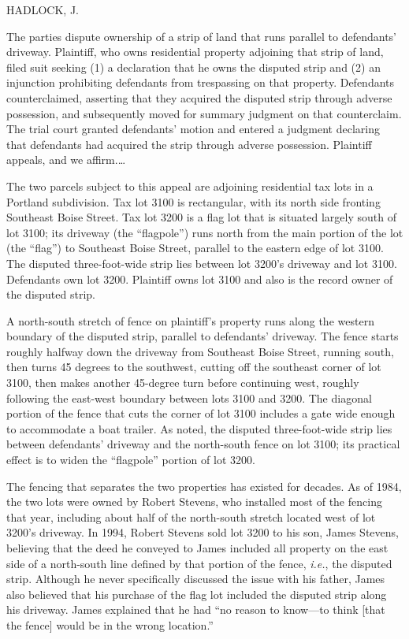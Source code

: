 
HADLOCK, J.

The parties dispute ownership of a strip of land that runs parallel to
defendants' driveway. Plaintiff, who owns residential property adjoining that
strip of land, filed suit seeking (1) a declaration that he owns the disputed
strip and (2) an injunction prohibiting defendants from trespassing on that
property. Defendants counterclaimed, asserting that they acquired the disputed
strip through adverse possession, and subsequently moved for summary judgment
on that counterclaim. The trial court granted defendants' motion and entered a
judgment declaring that defendants had acquired the strip through adverse
possession. Plaintiff appeals, and we affirm.\ldots


The two parcels subject to this appeal are adjoining residential tax lots in a
Portland subdivision. Tax lot 3100 is rectangular, with its north side fronting
Southeast Boise Street. Tax lot 3200 is a flag lot that is situated largely
south of lot 3100; its driveway (the ``flagpole'') runs north from the main
portion of the lot (the ``flag'') to Southeast Boise Street, parallel to the
eastern edge of lot 3100. The disputed three-foot-wide strip lies between lot
3200's driveway and lot 3100. Defendants own lot 3200. Plaintiff owns lot 3100
and also is the record owner of the disputed strip. 

A north-south stretch of fence on plaintiff's property runs along the western
boundary of the disputed strip, parallel to defendants' driveway. The fence
starts roughly halfway down the driveway from Southeast Boise Street, running
south, then turns 45 degrees to the southwest, cutting off the southeast corner
of lot 3100, then makes another 45-degree turn before continuing west, roughly
following the east-west boundary between lots 3100 and 3200. The diagonal
portion of the fence that cuts the corner of lot 3100 includes a gate wide
enough to accommodate a boat trailer. As noted, the disputed three-foot-wide
strip lies between defendants' driveway and the north-south fence on lot 3100;
its practical effect is to widen the ``flagpole'' portion of lot 3200. 

The fencing that separates the two properties has existed for decades. As of
1984, the two lots were owned by Robert Stevens, who installed most of the
fencing that year, including about half of the north-south stretch located west
of lot 3200's driveway. In 1994, Robert Stevens sold lot 3200 to his son, James
Stevens, believing that the deed he conveyed to James included all property on
the east side of a north-south line defined by that portion of the fence,
\textit{i.e.}, the disputed strip. Although he never specifically discussed the
issue with his father, James also believed that his purchase of the
flag lot included the disputed strip along his driveway. James explained that
he had ``no reason to know---to think [that the fence] would be in the wrong
location.''

